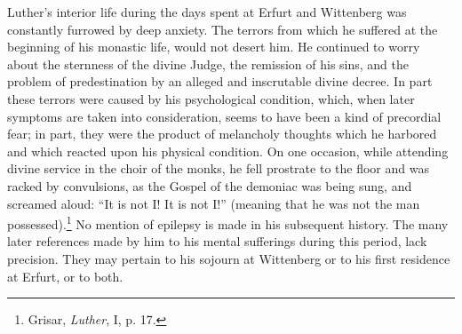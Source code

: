 Luther’s interior life during the days spent at Erfurt and Wittenberg
was constantly furrowed by deep anxiety. The terrors from
which he suffered at the beginning of his monastic life, would not
desert him. He continued to worry about the sternness of the divine
Judge, the remission of his sins, and the problem of predestination
by an alleged and inscrutable divine decree. In part these terrors
were caused by his psychological condition, which, when later symptoms
are taken into consideration, seems to have been a kind of precordial
fear; in part, they were the product of melancholy thoughts
which he harbored and which reacted upon his physical condition.
On one occasion, while attending divine service in the choir of the
monks, he fell prostrate to the floor and was racked by convulsions,
as the Gospel of the demoniac was being sung, and screamed aloud:
“It is not I! It is not I!” (meaning that he was not the man possessed).\footnote{Grisar, \textit{Luther}, I, p. 17.}
No mention of epilepsy is made in his subsequent history.
The many later references made by him to his mental sufferings during
this period, lack precision. They may pertain to his sojourn at
Wittenberg or to his first residence at Erfurt, or to both.

